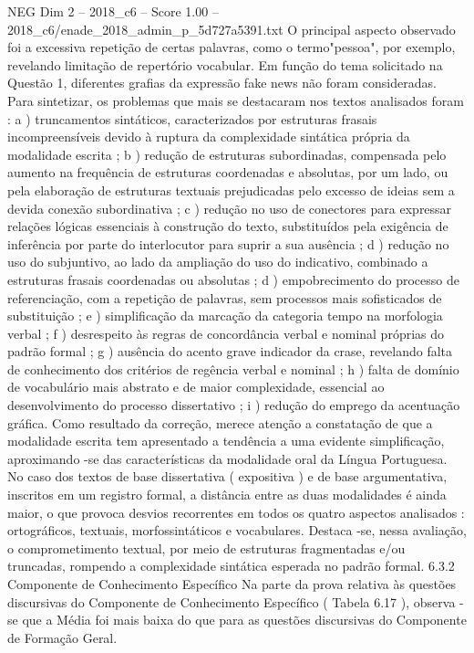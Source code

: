 \begin{textsample}{NEG Dim 2 – 2018\_c6 – Score 1.00 – 2018\_c6/enade\_2018\_admin\_p\_5d727a5391.txt}
O principal aspecto observado foi a excessiva repetição de certas palavras, como o termo"pessoa", por exemplo, revelando limitação de repertório vocabular.
Em função do tema solicitado na Questão 1, diferentes grafias da expressão fake news não foram consideradas.
Para sintetizar, os problemas que mais se destacaram nos textos analisados foram : a ) truncamentos sintáticos, caracterizados por estruturas frasais incompreensíveis devido à ruptura da complexidade sintática própria da modalidade escrita ; b ) redução de estruturas subordinadas, compensada pelo aumento na frequência de estruturas coordenadas e absolutas, por um lado, ou pela elaboração de estruturas textuais prejudicadas pelo excesso de ideias sem a devida conexão subordinativa ; c ) redução no uso de conectores para expressar relações lógicas essenciais à construção do texto, substituídos pela exigência de inferência por parte do interlocutor para suprir a sua ausência ; d ) redução no uso do subjuntivo, ao lado da ampliação do uso do indicativo, combinado a estruturas frasais coordenadas ou absolutas ; d ) empobrecimento do processo de referenciação, com a repetição de palavras, sem processos mais sofisticados de substituição ; e ) simplificação da marcação da categoria tempo na morfologia verbal ; f ) desrespeito às regras de concordância verbal e nominal próprias do padrão formal ; g ) ausência do acento grave indicador da crase, revelando falta de conhecimento dos critérios de regência verbal e nominal ; h ) falta de domínio de vocabulário mais abstrato e de maior complexidade, essencial ao desenvolvimento do processo dissertativo ; i ) redução do emprego da acentuação gráfica.
Como resultado da correção, merece atenção a constatação de que a modalidade escrita tem apresentado a tendência a uma evidente simplificação, aproximando -se das características da modalidade oral da Língua Portuguesa.
No caso dos textos de base dissertativa ( expositiva ) e de base argumentativa, inscritos em um registro formal, a distância entre as duas modalidades é ainda maior, o que provoca desvios recorrentes em todos os quatro aspectos analisados : ortográficos, textuais, morfossintáticos e vocabulares.
Destaca -se, nessa avaliação, o comprometimento textual, por meio de estruturas fragmentadas e/ou truncadas, rompendo a complexidade sintática esperada no padrão formal. 6.3.2 Componente de Conhecimento Específico Na parte da prova relativa às questões discursivas do Componente de Conhecimento Específico ( Tabela 6.17 ), observa -se que a Média foi mais baixa do que para as questões discursivas do Componente de Formação Geral.

\end{textsample}
